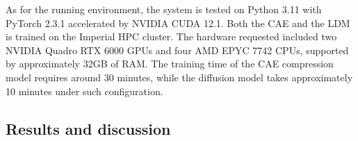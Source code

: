 \documentclass[final-report]{article-template}
\begin{document}
\begin{table}[ht]
    \centering
    \caption{Hyperparameter configurations of the CAE and the Latent Diffusion Model.}
    \tabcolsep=0.38cm
    \renewcommand\arraystretch{0.7}
    \label{tab:hyperparam}
\end{table}

As for the running environment, the system is tested on Python 3.11 with PyTorch 2.3.1 accelerated by NVIDIA CUDA 12.1. Both the CAE and the LDM is trained on the Imperial HPC cluster. The hardware requested included two NVIDIA Quadro RTX 6000 GPUs and four AMD EPYC 7742 CPUs, supported by approximately 32GB of RAM. The training time of the CAE compression model requires around 30 minutes, while the diffusion model takes approximately 10 minutes under such configuration.
 

\subsection{Results and discussion}
\end{document}

